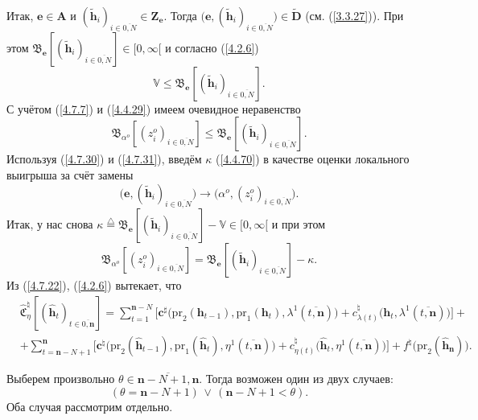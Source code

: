 \documentclass[12pt]{report}
\newcommand{\bfn}{\begin{equation}}
\newcommand{\efn}{\end{equation}}
\newcommand{\df}{\stackrel{\triangle}{=}}
\newcommand{\ov}{\overline}
\newcommand{\la}{\lambda}
\newcommand{\al}{\alpha}
\newcommand{\bbv}{{\mathbb V}}
\newcommand{\zc}{{\mathbf c}}
\newcommand{\nn}{{\mathbf n}}
\begin{document}
{{Итак, $\mathbf{e}\in \mathbf{A}$ и $(\tilde{\mathbf{h}}_i)_{i\in\ov{0,N}}\in
\mathbf{Z}_\mathbf{e}.$ Тогда $\bigl(\mathbf{e},(\tilde{\mathbf{h}}_i)_{i\in\ov{0,N}}\bigl)\in
\widetilde{\mathbf{D}}$ (см.  (\ref{3.3.27})). При этом
$\mathfrak{B}_\mathbf{e}[(\tilde{\mathbf{h}}_i)_{i\in\ov{0,N}}]\in [0,\infty[$ и согласно (\ref{4.2.6})
\bfn\label{4.7.30}\bbv\leqslant \mathfrak{B}_\mathbf{e}[(\tilde{\mathbf{h}}_i)_{i\in\ov{0,N}}].
\efn
С учётом (\ref{4.7.7}) и (\ref{4.4.29}) имеем очевидное неравенство
\bfn\label{4.7.31}\mathfrak{B}_{\al^o}[(z_i^o)_{i\in\ov{0,N}}] \leqslant
\mathfrak{B}_\mathbf{e}[(\tilde{\mathbf{h}}_i)_{i\in\ov{0,N}}].
\efn
Используя (\ref{4.7.30}) и (\ref{4.7.31}), введём $\kappa$ (\ref{4.4.70}) в
качестве оценки локального выигрыша за счёт замены
$$\bigl(\mathbf{e},(\tilde{\mathbf{h}}_i)_{i\in\ov{0,N}}\bigl) \longrightarrow \bigl(\al^o,
(z_i^o)_{i\in\ov{0,N}}\bigl).
$$
Итак, у нас снова $\kappa \df \mathfrak{B}_\mathbf{e}[(\tilde{\mathbf{h}}_i)_{i\in\ov{0,N}}]-
\bbv \in [0,\infty[$  и при этом
\bfn\label{4.7.32}\mathfrak{B}_{\al^o}[(z_i^o)_{i\in\ov{0,N}}] =
\mathfrak{B}_\mathbf{e}[(\tilde{\mathbf{h}}_i)_{i\in\ov{0,N}}]- \kappa.
\efn
Из (\ref{4.7.22}), (\ref{4.2.6})
вытекает, что
\begin{eqnarray}
&\widehat{\mathfrak{C}}_\eta^\natural[(\hat{\mathbf{h}}_t)_{t\in\ov{0,\nn}}]=
\sum\limits_{t=1}^{\nn-N}\bigl[\zc^\sharp\bigl(\mathrm{pr}_2(\mathbf{h}_{t-1}),\mathrm{pr}_1
(\mathbf{h}_t),\la^1(\ov{t,\nn})\bigl) +c_{\la(t)}^\natural\bigl(\mathbf{h}_t,\la^1(\ov{t,\nn})\bigl)\bigl]+
&\nonumber\\
&+\sum\limits_{t=\nn-N+1}^\nn\bigl[\zc^\natural\bigl(\mathrm{pr}_2(\hat{\mathbf{h}}_{t-1}),
\mathrm{pr}_1(\hat{\mathbf{h}}_t),\eta^1(\ov{t,\nn})\bigl) +
c_{\eta(t)}^\natural\bigl(\hat{\mathbf{h}}_t,\eta^1(\ov{t,\nn})\bigl)\bigl] +
f^\natural\bigl(\mathrm{pr}_2(\hat{\mathbf{h}}_\nn)\bigl).
&\label{4.7.33}
\end{eqnarray}

Выберем произвольно $\theta\in\ov{\nn-N+1,\nn}.$ Тогда возможен один из двух случаев:
\bfn\label{4.7.38}(\theta =\nn-N+1)\,\vee\,(\nn-N+1< \theta).
\efn
Оба случая рассмотрим отдельно.

}}
\end{document}
